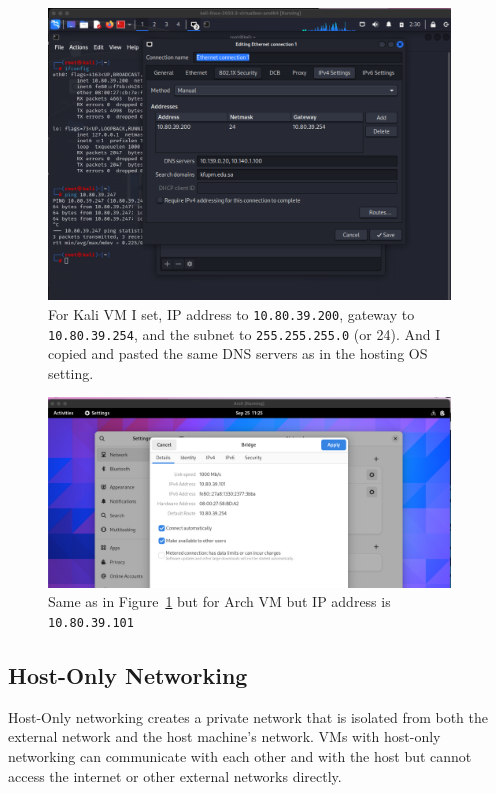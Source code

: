 \documentclass{article}
\def\c#1{\texttt{#1}}
\begin{document}
\begin{figure}
	\begin{center}
		\includegraphics[width=0.95\textwidth]{figures/bridged-set2.png}
	\end{center}
	\caption{For Kali VM I set, IP address to \c{10.80.39.200}, gateway to \c{10.80.39.254}, and the subnet to \c{255.255.255.0} (or 24). And I copied and pasted the same DNS servers as in the hosting OS setting.}
	\label{fig:bridge-kali}
\end{figure}

\begin{figure}
	\begin{center}
		\includegraphics[width=0.95\textwidth]{figures/arch-bridge.png}
	\end{center}
	\caption{Same as in Figure~\ref{fig:bridge-kali} but for Arch VM but IP address is \c{10.80.39.101}}
\end{figure}


\subsection{Host-Only Networking}
Host-Only networking creates a private network that is isolated from both the external network and the host machine's network. VMs with host-only networking can communicate with each other and with the host but cannot access the internet or other external networks directly.
\end{document}
